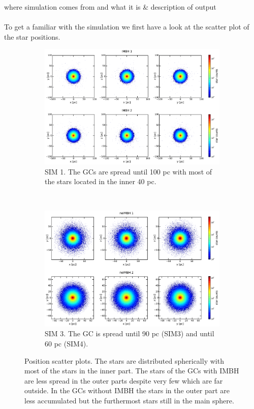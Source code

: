 \color{red}where simulation comes from and what it is \& description of output \color{black}\\
\\
To get a familiar with the simulation we first have a look at the scatter plot of the star positions.
\begin{figure}[htbp] 
\centering
\begin{subfigure}{0.9\textwidth}
	\centering
  	\includegraphics[width=\textwidth]{Plots/position_scatter_plot_IMBH.pdf}
  	\caption{SIM 1. The \acp{GC} are spread until 100 pc with most of the stars located in the inner 40 pc.}
 	\label{fig:pos_scat_IMBH}
\end{subfigure}
\\
\begin{subfigure}{0.9\textwidth}
	\centering
  	\includegraphics[width=\textwidth]{Plots/position_scatter_plot_noIMBH.pdf}
  	\caption{SIM 3. The \ac{GC} is spread until 90 pc (SIM3) and until 60 pc (SIM4).}
 	\label{fig:pos_scat_noIMBH}
\end{subfigure}

\caption{Position scatter plots. The stars are distributed spherically with most of the stars in the inner part. The stars of the \acp{GC} with \ac{IMBH} are less spread in the outer parts despite very few which are far outside. In the \acp{GC} without \ac{IMBH} the stars in the outer part are less accumulated but the furthermost stars still in the main sphere.}
\label{fig:position_scatter}
\end{figure}

